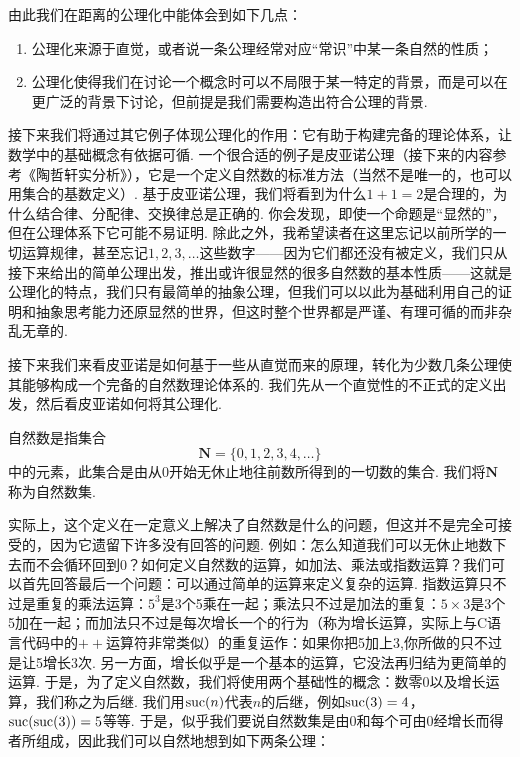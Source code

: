 由此我们在距离的公理化中能体会到如下几点：
\begin{enumerate}
    \item 公理化来源于直觉，或者说一条公理经常对应``常识''中某一条自然的性质；

    \item 公理化使得我们在讨论一个概念时可以不局限于某一特定的背景，而是可以在更广泛的背景下讨论，但前提是我们需要构造出符合公理的背景.
\end{enumerate}

接下来我们将通过其它例子体现公理化的作用：它有助于构建完备的理论体系，让数学中的基础概念有依据可循. 一个很合适的例子是皮亚诺公理（接下来的内容参考《陶哲轩实分析》），它是一个定义自然数的标准方法（当然不是唯一的，也可以用集合的基数定义）. 基于皮亚诺公理，我们将看到为什么$1+1=2$是合理的，为什么结合律、分配律、交换律总是正确的. 你会发现，即使一个命题是``显然的''，但在公理体系下它可能不易证明. 除此之外，我希望读者在这里忘记以前所学的一切运算规律，甚至忘记$1,2,3,\ldots$这些数字——因为它们都还没有被定义，我们只从接下来给出的简单公理出发，推出或许很显然的很多自然数的基本性质——这就是公理化的特点，我们只有最简单的抽象公理，但我们可以以此为基础利用自己的证明和抽象思考能力还原显然的世界，但这时整个世界都是严谨、有理可循的而非杂乱无章的.

接下来我们来看皮亚诺是如何基于一些从直觉而来的原理，转化为少数几条公理使其能够构成一个完备的自然数理论体系的. 我们先从一个直觉性的不正式的定义出发，然后看皮亚诺如何将其公理化.

\begin{definition}%
    自然数是指集合
    \[\mathbf{N}=\{0,1,2,3,4,\ldots\}\]
    中的元素，此集合是由从0开始无休止地往前数所得到的一切数的集合. 我们将$\mathbf{N}$称为自然数集.
\end{definition}

实际上，这个定义在一定意义上解决了自然数是什么的问题，但这并不是完全可接受的，因为它遗留下许多没有回答的问题. 例如：怎么知道我们可以无休止地数下去而不会循环回到0？如何定义自然数的运算，如加法、乘法或指数运算？我们可以首先回答最后一个问题：可以通过简单的运算来定义复杂的运算. 指数运算只不过是重复的乘法运算：$5^3$是3个5乘在一起；乘法只不过是加法的重复：$5\times 3$是3个5加在一起；而加法只不过是每次增长一个的行为（称为增长运算，实际上与C语言代码中的$++$运算符非常类似）的重复运作：如果你把5加上3,你所做的只不过是让5增长3次. 另一方面，增长似乎是一个基本的运算，它没法再归结为更简单的运算. 于是，为了定义自然数，我们将使用两个基础性的概念：数零0以及增长运算，我们称之为后继. 我们用$\operatorname{suc}(n)$代表$n$的后继，例如$\operatorname{suc}(3)=4$，$\operatorname{suc}(\operatorname{suc}(3))=5$等等. 于是，似乎我们要说自然数集是由0和每个可由0经增长而得者所组成，因此我们可以自然地想到如下两条公理：

